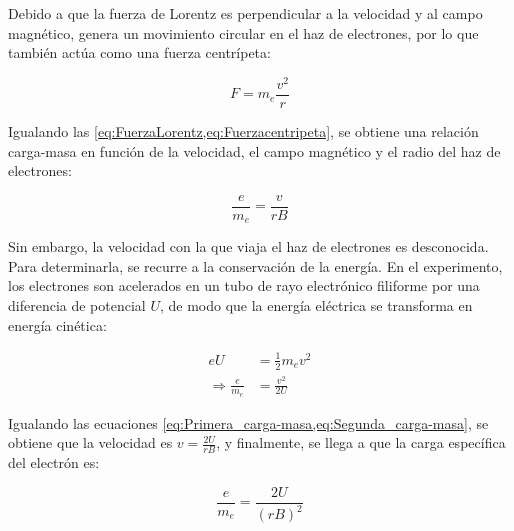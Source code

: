 Debido a que la fuerza de Lorentz es perpendicular a la velocidad y al campo
magnético, genera un movimiento circular en el haz de electrones, por lo que
también actúa como una fuerza centrípeta:

\begin{equation}
  F = m_{e} \frac{v^{2}}{r}
  \label{eq:Fuerzacentripeta}
\end{equation}

Igualando las \cref{eq:FuerzaLorentz,eq:Fuerzacentripeta}, se obtiene una
relación carga-masa en función de la velocidad, el campo magnético y el radio
del haz de electrones:

\begin{equation}
  \frac{e}{m_{e}} = \frac{v}{r B}
  \label{eq:Primera_carga-masa}
\end{equation}

Sin embargo, la velocidad con la que viaja el haz de electrones es desconocida.
Para determinarla, se recurre a la conservación de la energía.
En el experimento, los electrones son acelerados en un tubo de rayo electrónico
filiforme por una diferencia de potencial \( U \), de modo que la energía
eléctrica se transforma en energía cinética:

\begin{equation}
  \begin{aligned}
    e U &= \frac{1}{2} m_{e} v^{2} \\
    \Rightarrow \frac{e}{m_{e}} &= \frac{v^{2}}{2 U}
  \end{aligned}
  \label{eq:Segunda_carga-masa}
\end{equation}

Igualando las ecuaciones \cref{eq:Primera_carga-masa,eq:Segunda_carga-masa},
se obtiene que la velocidad es \( v = \frac{2 U}{r B} \), y finalmente,
se llega a que la carga específica del electrón es:

\begin{equation}
  \frac{e}{m_{e}} = \frac{2 U}{(r B)^{2}}
  \label{eq:carga-masa}
\end{equation}

